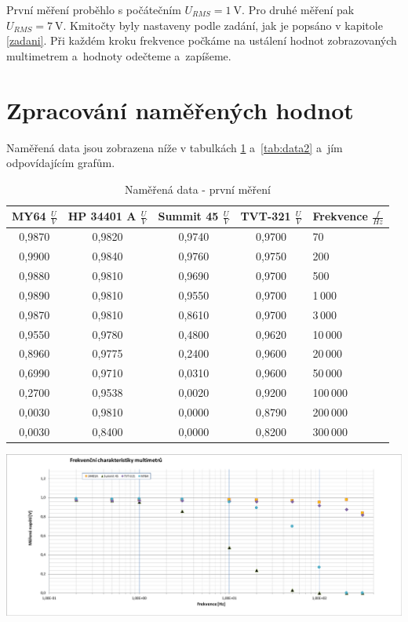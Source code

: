 \documentclass[a4paper,12pt]{article}   %
\begin{document}
První měření proběhlo s počátečním $U_{RMS} = 1~\textrm{V}$. Pro druhé měření pak $U_{RMS} = 7~\textrm{V}$. Kmitočty byly nastaveny podle zadání, jak je popsáno v kapitole \ref{zadani}. Při každém kroku frekvence počkáme na ustálení hodnot zobrazovaných multimetrem a~hodnoty odečteme a~zapíšeme.




\section{Zpracování naměřených hodnot}
Naměřená data jsou zobrazena níže v tabulkách \ref{tab:data1} a~\ref{tab:data2} a~jím odpovídajícím grafům.

\begin{table}[h!]
    \centering
    \begin{tabular}{|c|c|c|c|l|}
    \hline
    \rule{0pt}{2.5ex}MY64 $\frac{U}{V}$&HP 34401 A	$\frac{U}{V}$&Summit 45 $\frac{U}{V}$   &TVT-321 $\frac{U}{V}$   & Frekvence $\frac{f}{Hz}$\\[.7ex]\hline\hline
    0,9870	& 0,9820	& 0,9740	& 0,9700    & 70\\\hline
    0,9900	& 0,9840	& 0,9760	& 0,9750    & 200\\\hline
    0,9880	& 0,9810	& 0,9690	& 0,9700    & 500\\\hline
    0,9890	& 0,9810	& 0,9550	& 0,9700    & 1\,000\\\hline
    0,9870	& 0,9810	& 0,8610	& 0,9700    & 3\,000\\\hline
    0,9550	& 0,9780	& 0,4800	& 0,9620    & 10\,000\\\hline
    0,8960	& 0,9775	& 0,2400	& 0,9600    & 20\,000\\\hline
    0,6990	& 0,9710	& 0,0310	& 0,9600    & 50\,000\\\hline
    0,2700	& 0,9538	& 0,0020	& 0,9200    & 100\,000\\\hline
    0,0030	& 0,9810	& 0,0000	& 0,8790    & 200\,000\\\hline
    0,0030	& 0,8400	& 0,0000	& 0,8200    & 300\,000\\\hline
    \end{tabular}
    \caption{Naměřená data - první měření} 
    \label{tab:data1}
\end{table}

\begin{graf}
    \centering
    \includegraphics[width=.9\textwidth]{graf1.pdf}
    \caption{Hodnoty z prvního měření}
    \label{graf1}
\end{graf}
\end{document}
